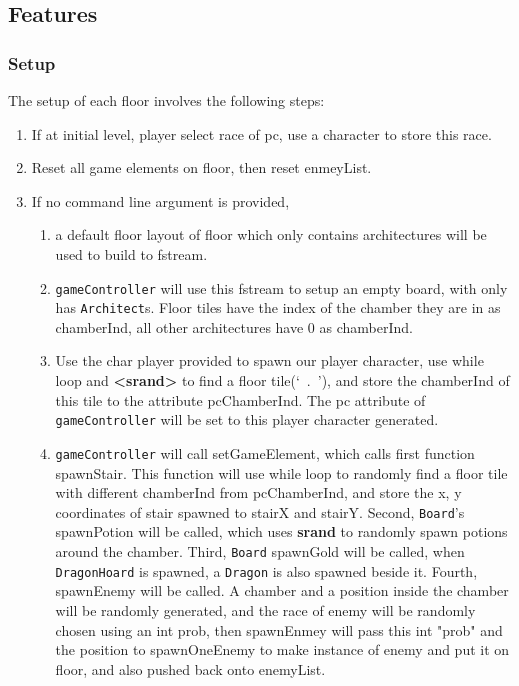 \documentclass[11pt]{article}
\theoremstyle{plain} \newtheorem{theorem*}{Theorem}[subsection]
\begin{document}
\subsection{Features}

\subsubsection{Setup}
The setup of each floor involves the following steps:
\begin{enumerate}[leftmargin=*]%
\item If at initial level, player select race of pc, 
	use a character to store this race.
\item Reset all game elements on \textsf{floor}, then reset \textsf{enmeyList}.
\item 
If no command line argument is provided, 
\begin{enumerate}[leftmargin=*, noitemsep, label=(\roman*)]
\item 
a default floor layout of floor which
only contains architectures will be used to build to fstream.
\item
\texttt{gameController} will use this fstream to setup an empty board, with
only has \texttt{Architect}s. Floor tiles have the index of the chamber they 
are in as \textsf{chamberInd}, all other architectures have 0 as 
\textsf{chamberInd}. 
\item
Use the char player provided to spawn our player character, 
use while loop and \textbf{<srand>} to find a floor tile(`\ .\ '), 
and store the \textsf{chamberInd} of this tile to 
the attribute \textsf{pcChamberInd}. The \textsf{pc} attribute of 
\texttt{gameController} will be set to this player character generated.
\item
\texttt{gameController} will call \textsf{setGameElement}, which calls first
function \textsf{spawnStair}. This function will use while loop to randomly
find a floor tile with different \textsf{chamberInd} from \textsf{pcChamberInd},
and store the x, y coordinates of stair spawned to \textsf{stairX} and 
\textsf{stairY}.
Second, \texttt{Board}'s \textsf{spawnPotion} will be called, which
uses \textbf{srand} to randomly spawn potions around the chamber.
Third, \texttt{Board} \textsf{spawnGold} will be called, when
\texttt{DragonHoard} is spawned, a \texttt{Dragon} is also spawned beside it.
Fourth, \textsf{spawnEnemy} will be called. A chamber and a position inside the
chamber will be randomly generated, and the race of enemy will be randomly
chosen using an int prob, then \textsf{spawnEnmey} will pass this int "prob"
and the position to \textsf{spawnOneEnemy} to make instance of enemy and 
put it on \textsf{floor}, and also pushed back onto \textsf{enemyList}.


\end{enumerate}
\end{enumerate}
\end{document}
